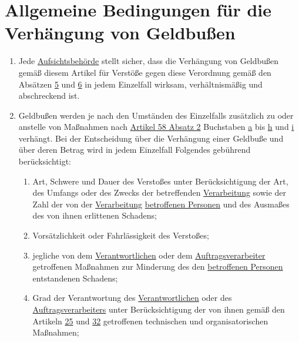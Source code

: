 \chapter{Allgemeine Bedingungen für die Verhängung von Geldbußen}
\label{ch:83}


\begin{enumerate}

  \item Jede \hyperref[itm:04-21]{Aufsichtsbehörde} stellt sicher, dass die Verhängung von Geldbußen gemäß diesem
   Artikel für Verstöße gegen diese Verordnung gemäß den Absätzen \hyperref[itm:83-5]{5} und \hyperref[itm:83-6]{6} in
   jedem Einzelfall wirksam, verhältnismäßig und abschreckend ist.
  \label{itm:83-1}

  \item Geldbußen werden je nach den Umständen des Einzelfalls zusätzlich zu oder anstelle von Maßnahmen nach \hyperref
   [itm:58-2]{Artikel 58 Absatz 2} Buchstaben \hyperref[itm:58-2a]{a} bis \hyperref[itm:58-2h]{h} und \hyperref
   [itm:58-2i]{i} verhängt. Bei der Entscheidung über die Verhängung einer Geldbuße und über deren Betrag wird in jedem
   Einzelfall Folgendes gebührend berücksichtigt:
  \label{itm:83-2}

  \begin{enumerate}
  
    \item Art, Schwere und Dauer des Verstoßes unter Berücksichtigung der Art, des Umfangs oder des Zwecks der
     betreffenden \hyperref[itm:04-2]{Verarbeitung} sowie der Zahl der von der \hyperref[itm:04-2]
     {Verarbeitung} \hyperref[itm:04-1]{betroffenen Personen} und des Ausmaßes des von ihnen erlittenen Schadens;
    \label{itm:83-2a}

    \item Vorsätzlichkeit oder Fahrlässigkeit des Verstoßes;
    \label{itm:83-2b}

    \item jegliche von dem \hyperref[itm:04-7]{Verantwortlichen} oder dem \hyperref[itm:04-8]
     {Auftragsverarbeiter} getroffenen Maßnahmen zur Minderung des den
     \hyperref[itm:04-1]{betroffenen Personen} entstandenen Schadens;
    \label{itm:83-2c}

    \item Grad der Verantwortung des \hyperref[itm:04-7]{Verantwortlichen} oder des \hyperref[itm:04-8]
     {Auftragsverarbeiters} unter Berücksichtigung der von ihnen gemäß den Artikeln \hyperref[ch:25]{25} und \hyperref
     [ch:32]{32} getroffenen technischen und organisatorischen Maßnahmen;
    \label{itm:83-2d}


\end{enumerate}
\end{enumerate}
